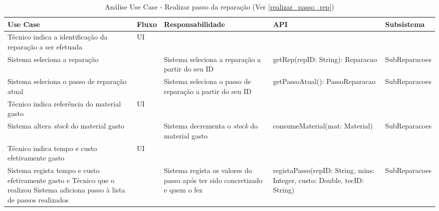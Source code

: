 \documentclass[../relatorio.tex]{subfiles}
\begin{document}
\begin{landscape}
    \begin{table}[!h]
        \centering
        \begin{tabular}{|p{5cm}|p{1cm}|p{4cm}|p{6cm}|p{3cm}|}
            \hline
            \rowcolor{gray!20!white}
            Use Case & Fluxo & Responsabilidade & API & Subsistema \\
            \hline
            \rowcolor{yellow}
            Técnico indica a identificação da reparação a ser efetuada 
                     & UI
                     &
                     &
                     &
            \\
            \hline
            Sistema seleciona a reparação
                     & 
                     & Sistema seleciona a reparação a partir do seu ID
                     & getRep(repID: String): Reparacao
                     & SubReparacoes
            \\
            \hline
            Sistema seleciona o passo de reparação atual
                    & 
                    & Sistema seleciona o passo de reparação a partir do seu ID
                    & getPassoAtual(): PassoReparacao
                    & SubReparacoes
            \\
            \hline
            \rowcolor{yellow}
            Técnico indica referência do material gasto
                     & UI
                     &
                     &
                     &        
            \\
            \hline
            \rowcolor{yellow}
            Sistema altera \textit{stock} do material gasto
                     & 
                     & Sistema decrementa o \textit{stock} do material gasto
                     & consumeMaterial(mat: Material)
                     & SubReparacoes
            \\
            \hline
            \rowcolor{yellow}
            Técnico indica tempo e custo efetivamente gasto
                     & UI
                     & 
                     &
                     & 
            \\
            \hline
            Sistema regista tempo e custo efetivamente gasto e Técnico que o realizou
            Sistema adiciona passo à lista de passos realizados
                     & 
                     & Sistema regista os valores do passo após ter sido concretizado e quem o fez
                     & registaPasso(repID: String, mins: Integer, custo: Double, tecID: String)
                     & SubReparacoes
            \\
            \hline
        \end{tabular}
        \caption{Análise Use Case - Realizar passo da reparação (Ver \ref{realizar_passo_rep})}
    \end{table}
\end{landscape}
\end{document}
